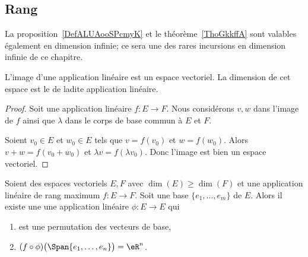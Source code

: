 \subsection{Rang}

La proposition~\ref{DefALUAooSPcmyK} et le théorème~\ref{ThoGkkffA} sont valables également en dimension infinie; ce sera une des rares incursions en dimension infinie de ce chapitre.
\begin{propositionDef}\label{DefALUAooSPcmyK}
	L'image d'une application linéaire est un espace vectoriel. La dimension de cet espace est le  de ladite application linéaire.
\end{propositionDef}

\begin{proof}
	Soit une application linéaire \( f\colon E\to F\). Nous considérons \( v,w\) dans l'image de \( f\) ainsi que \( \lambda\) dans le corps de base commun à \( E\) et \( F\).

	Soient \( v_0\in E\) et \( w_0\in E\) tels que \( v=f(v_0)\) et \( w=f(w_0)\). Alors \( v+w=f(v_0+w_0)\) et \( \lambda v=f(\lambda v_0)\). Donc l'image est bien un espace vectoriel.
\end{proof}


\begin{lemma}	\label{LEMooARZGooMOlgsl}
	Soient des espaces vectoriels \( E,F\) avec \( \dim(E)\geq \dim(F)\) et une application linéaire de rang maximum \(f \colon E\to F  \). Soit une base \( \{ e_1,\ldots,e_m \}\) de \( E\). Alors il existe une une application linéaire \(\phi \colon E\to E  \) qui
	\begin{enumerate}
		\item
		      est une permutation des vecteurs de base,
		\item
		      \( (f\circ\phi)\big( \Span\{ e_1,\ldots,e_n \} \big)=\eR^n\).
	\end{enumerate}
\end{lemma}


